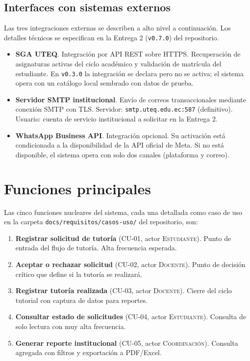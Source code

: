 \documentclass[11pt,a4paper,twoside]{report}
\newcommand{\actor}[1]{\textsc{#1}}
\begin{document}
\subsection{Interfaces con sistemas externos}

Las tres integraciones externas se describen a alto nivel a continuaci\'on. Los detalles t\'ecnicos se especifican en la Entrega 2 (\texttt{v0.7.0}) del repositorio.

\begin{itemize}[leftmargin=1.5em,itemsep=3pt]
    \item \textbf{SGA UTEQ}. Integraci\'on por API REST sobre HTTPS. Recuperaci\'on de asignaturas activas del ciclo acad\'emico y validaci\'on de matr\'icula del estudiante. En \texttt{v0.3.0} la integraci\'on se declara pero no se activa; el sistema opera con un cat\'alogo local sembrado con datos de prueba.
    \item \textbf{Servidor SMTP institucional}. Env\'io de correos transaccionales mediante conexi\'on SMTP con TLS. Servidor: \texttt{smtp.uteq.edu.ec:587} (definitivo). Usuario: cuenta de servicio institucional a solicitar en la Entrega 2.
    \item \textbf{WhatsApp Business API}. Integraci\'on opcional. Su activaci\'on est\'a condicionada a la disponibilidad de la API oficial de Meta. Si no est\'a disponible, el sistema opera con solo dos canales (plataforma y correo).
\end{itemize}

\section{Funciones principales}
\label{sec:funciones}

Las cinco funciones nucleares del sistema, cada una detallada como caso de uso en la carpeta \texttt{docs/requisitos/casos-uso/} del repositorio, son:

\begin{enumerate}[leftmargin=1.5em,itemsep=3pt]
    \item \textbf{Registrar solicitud de tutor\'ia} (CU-01, actor \actor{Estudiante}). Punto de entrada del flujo de tutor\'ia. Alta frecuencia esperada.
    \item \textbf{Aceptar o rechazar solicitud} (CU-02, actor \actor{Docente}). Punto de decisi\'on cr\'itico que define si la tutor\'ia se realizar\'a.
    \item \textbf{Registrar tutor\'ia realizada} (CU-03, actor \actor{Docente}). Cierre del ciclo tutorial con captura de datos para reportes.
    \item \textbf{Consultar estado de solicitudes} (CU-04, actor \actor{Estudiante}). Consulta de solo lectura con muy alta frecuencia.
    \item \textbf{Generar reporte institucional} (CU-05, actor \actor{Coordinaci\'on}). Consulta agregada con filtros y exportaci\'on a PDF/Excel.
\end{enumerate}
\end{document}
